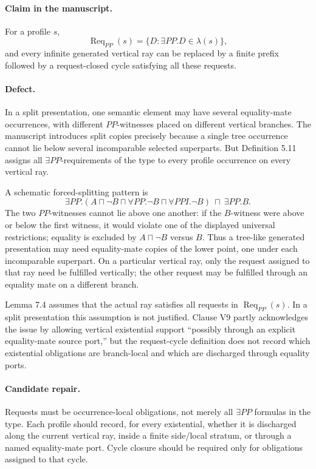 \documentclass[11pt]{article}
\newcommand{\Req}{\operatorname{Req}}
\begin{document}
\paragraph{Claim in the manuscript.} For a profile $s$,
\[
  \Req_{PP}(s)=\{D: \exists PP.D\in\lambda(s)\},
\]
and every infinite generated vertical ray can be replaced by a finite prefix followed by a request-closed cycle satisfying all these requests.

\paragraph{Defect.} In a split presentation, one semantic element may have several equality-mate occurrences, with different $PP$-witnesses placed on different vertical branches. The manuscript introduces split copies precisely because a single tree occurrence cannot lie below several incomparable selected superparts. But Definition 5.11 assigns all $\exists PP$-requirements of the type to every profile occurrence on every vertical ray.

A schematic forced-splitting pattern is
\[
  \exists PP.(A\sqcap\neg B\sqcap\forall PP.\neg B\sqcap\forall PPI.\neg B)
  \ \sqcap\
  \exists PP.B.
\]
The two $PP$-witnesses cannot lie above one another: if the $B$-witness were above or below the first witness, it would violate one of the displayed universal restrictions; equality is excluded by $A\sqcap\neg B$ versus $B$. Thus a tree-like generated presentation may need equality-mate copies of the lower point, one under each incomparable superpart. On a particular vertical ray, only the request assigned to that ray need be fulfilled vertically; the other request may be fulfilled through an equality mate on a different branch.

Lemma 7.4 assumes that the actual ray satisfies all requests in $\Req_{PP}(s)$. In a split presentation this assumption is not justified. Clause V9 partly acknowledges the issue by allowing vertical existential support ``possibly through an explicit equality-mate source port,'' but the request-cycle definition does not record which existential obligations are branch-local and which are discharged through equality ports.

\paragraph{Candidate repair.} Requests must be occurrence-local obligations, not merely all $\exists PP$ formulas in the type. Each profile should record, for every existential, whether it is discharged along the current vertical ray, inside a finite side/local stratum, or through a named equality-mate port. Cycle closure should be required only for obligations assigned to that cycle.
\end{document}
